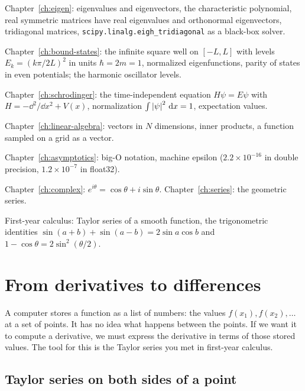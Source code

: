 \begin{prerequisites}
\item Chapter~\ref{ch:eigen}: eigenvalues and eigenvectors, the characteristic polynomial, real symmetric matrices have real eigenvalues and orthonormal eigenvectors, tridiagonal matrices, \texttt{scipy.linalg.eigh\_tridiagonal} as a black-box solver.
\item Chapter~\ref{ch:bound-states}: the infinite square well on $[-L,L]$ with levels $E_k=(k\pi/2L)^2$ in units $\hbar=2m=1$, normalized eigenfunctions, parity of states in even potentials; the harmonic oscillator levels.
\item Chapter~\ref{ch:schrodinger}: the time-independent equation $H\psi=E\psi$ with $H=-\dd^2/\dd x^2+V(x)$, normalization $\int\left\lvert \psi\right\rvert^2\,\mathrm{d} x=1$, expectation values.
\item Chapter~\ref{ch:linear-algebra}: vectors in $N$ dimensions, inner products, a function sampled on a grid as a vector.
\item Chapter~\ref{ch:asymptotics}: big-O notation, machine epsilon ($2.2\times10^{-16}$ in double precision, $1.2\times10^{-7}$ in float32).
\item Chapter~\ref{ch:complex}: $e^{i\theta}=\cos\theta+i\sin\theta$. Chapter~\ref{ch:series}: the geometric series.
\item First-year calculus: Taylor series of a smooth function, the trigonometric identities $\sin(a+b)+\sin(a-b)=2\sin a\cos b$ and $1-\cos\theta=2\sin^2(\theta/2)$.
\end{prerequisites}

\section{From derivatives to differences}\label{sec:finite-differences-differences}

A computer stores a function as a list of numbers: the values $f(x_1),f(x_2),\dots$ at a set of points. It has no idea what happens between the points. If we want it to compute a derivative, we must express the derivative in terms of those stored values. The tool for this is the Taylor series you met in first-year calculus.

\subsection{Taylor series on both sides of a point}

